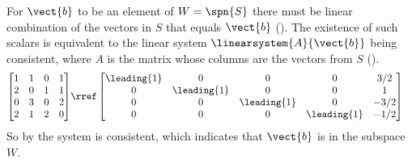 For $\vect{b}$ to be an element of $W=\spn{S}$ there must be linear combination of the vectors in $S$ that equals $\vect{b}$ ().  The existence of such scalars is equivalent to the linear system $\linearsystem{A}{\vect{b}}$ being consistent, where $A$ is the matrix whose columns are the vectors from $S$ ().
%
\begin{align*}
\begin{bmatrix} 
1 & 1 & 0 & 1\\
2 & 0 & 1 & 1\\
0 & 3 & 0 & 2\\
2 & 1 & 2 & 0
\end{bmatrix} 
&\rref
\begin{bmatrix} 
\leading{1} & 0 & 0 & 0 & 3/2\\ 
0 & \leading{1} & 0 & 0 & 1\\ 
0 & 0 & \leading{1} & 0 & -3/2 \\
0 & 0 & 0& \leading{1} & -1/2
\end{bmatrix}
\end{align*}
%
So by  the system is consistent, which indicates that $\vect{b}$ is in the subspace $W$.